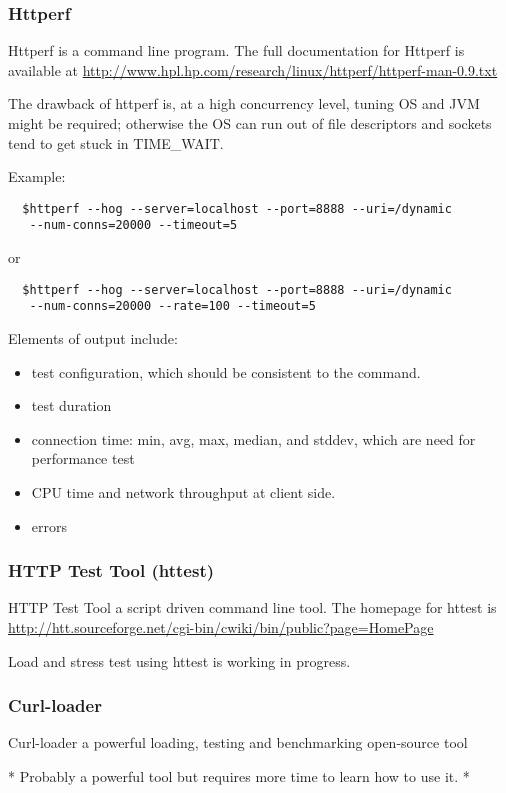 \documentclass[12pt, a4paper, twoside]{article}
\begin{document}
\subsubsection{Httperf}
\label{httperf_performance}
Httperf is a command line program.  The full documentation for Httperf is available at \url{http://www.hpl.hp.com/research/linux/httperf/httperf-man-0.9.txt}

The drawback of httperf is, at a high concurrency level, tuning OS and JVM might be required; otherwise the OS can run out of  file descriptors and sockets tend to get stuck in TIME\_WAIT.

Example:
\begin{verbatim}
  $httperf --hog --server=localhost --port=8888 --uri=/dynamic
   --num-conns=20000 --timeout=5
\end{verbatim}
or
\begin{verbatim}
  $httperf --hog --server=localhost --port=8888 --uri=/dynamic
   --num-conns=20000 --rate=100 --timeout=5
\end{verbatim}
Elements of output include:
\begin{itemize}
  \item test configuration, which should be consistent to the command.
  \item test duration
  \item connection time: min, avg, max, median, and stddev, which are need for performance test
  \item CPU time and network throughput at client side.
  \item errors
\end{itemize}


\subsubsection{HTTP Test Tool (httest)}
HTTP Test Tool a script driven command line tool.  The homepage for httest is 
\url{http://htt.sourceforge.net/cgi-bin/cwiki/bin/public?page=HomePage}

Load and stress test using httest is working in progress.

\subsubsection{Curl-loader}
Curl-loader a powerful loading, testing and benchmarking open-source tool

* Probably a powerful tool but requires more time to learn how to use it. *  
\end{document}
